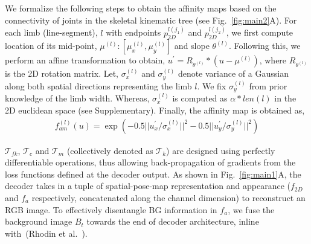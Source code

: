\documentclass[letterpaper]{article} \usepackage{aaai20}  \usepackage{times}  \usepackage{helvet}  \usepackage{courier}  \usepackage{url}  \usepackage{graphicx}  \usepackage{amsmath}
\begin{document}
We formalize the following steps to obtain the affinity maps based on the connectivity of joints in the skeletal kinematic tree (see Fig.~\ref{fig:main2}A). For each limb (line-segment), $l$ with endpoints $p_{2D}^{l(j_1)}$ and $p_{2D}^{l(j_2)}$, we first compute location of its mid-point, $\mu^{(l)}:[\mu_x^{(l)},\mu_y^{(l)}]$ and slope $\theta^{(l)}$. Following this, we perform an affine transformation to obtain, $u^\prime = R_{\theta^{(l)}}*(u-\mu^{(l)})$, where $R_{\theta^{(l)}}$ is the 2D rotation matrix. Let, $\sigma_x^{(l)}$ and $\sigma_y^{(l)}$ denote variance of a Gaussian along both spatial directions representing the limb $l$. We fix $\sigma_y^{(l)}$ from prior knowledge of the limb width. Whereas, $\sigma_x^{(l)}$ is computed as $\alpha*len(l)$ in the 2D euclidean space (see Supplementary). Finally, the affinity map is obtained as,
\begin{eqnarray*}
f_{am}^{(l)}(u) = \exp(-0.5||u_x^\prime/\sigma_x^{(l)}||^2-0.5||u_y^\prime/\sigma_y^{(l)}||^2) 
\end{eqnarray*}


$\mathcal{T}_{fk}$, $\mathcal{T}_{c}$ and $\mathcal{T}_{m}$ (collectively denoted as $\mathcal{T}_k$) are designed using perfectly differentiable operations, thus allowing back-propagation of gradients from the loss functions defined at the decoder output. As shown in Fig.~\ref{fig:main1}A, the decoder takes in a tuple of spatial-pose-map representation and appearance ($f_{2D}$ and $f_a$ respectively, concatenated along the channel dimension) to reconstruct an RGB image. To effectively disentangle BG information in $f_a$, we fuse the background image $B_t$ towards the end of decoder architecture, inline with~({\color{coolblack}Rhodin et al.~\citeyear{rhodin2018unsupervised}}).
\end{document}
